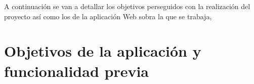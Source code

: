 


A continuación se van a detallar los objetivos perseguidos con la realización del proyecto así como los de la aplicación Web sobra la que se trabaja,



\section{Objetivos de la aplicación y funcionalidad previa}
   
